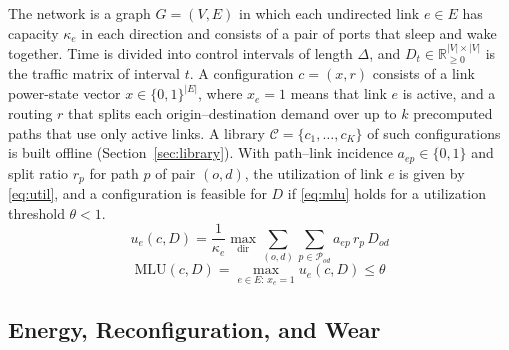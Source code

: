 \documentclass[conference]{IEEEtran}
\begin{document}
The network is a graph $G=(V,E)$ in which each undirected link $e\in E$ has capacity $\kappa_e$ in each direction and consists of a pair of ports that sleep and wake together. Time is divided into control intervals of length $\Delta$, and $D_t\in\mathbb{R}_{\ge 0}^{|V|\times|V|}$ is the traffic matrix of interval $t$. A configuration $c=(x,r)$ consists of a link power-state vector $x\in\{0,1\}^{|E|}$, where $x_e=1$ means that link $e$ is active, and a routing $r$ that splits each origin--destination demand over up to $k$ precomputed paths that use only active links. A library $\mathcal{C}=\{c_1,\dots,c_K\}$ of such configurations is built offline (Section~\ref{sec:library}). With path--link incidence $a_{ep}\in\{0,1\}$ and split ratio $r_p$ for path $p$ of pair $(o,d)$, the utilization of link $e$ is given by \eqref{eq:util}, and a configuration is feasible for $D$ if \eqref{eq:mlu} holds for a utilization threshold $\theta<1$.
\begin{equation}\label{eq:util}
u_e(c,D)=\frac{1}{\kappa_e}\max_{\text{dir}}\sum_{(o,d)}\sum_{p\in\mathcal{P}_{od}} a_{ep}\,r_p\,D_{od}
\end{equation}
\begin{equation}\label{eq:mlu}
\mathrm{MLU}(c,D)=\max_{e\in E:\,x_e=1}u_e(c,D)\le\theta
\end{equation}

\subsection{Energy, Reconfiguration, and Wear}
\end{document}
